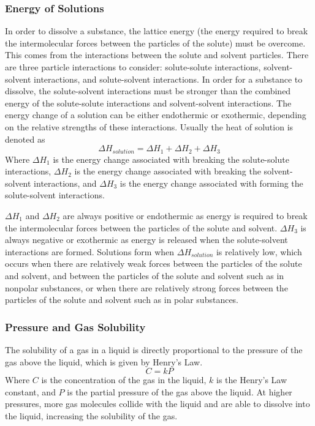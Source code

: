 \subsubsection{Energy of Solutions}
In order to dissolve a substance, the lattice energy (the energy required to break the intermolecular forces between the particles of the solute) must be overcome. This comes from the interactions between the solute and solvent particles. There are three particle interactions to consider: solute-solute interactions, solvent-solvent interactions, and solute-solvent interactions. In order for a substance to dissolve, the solute-solvent interactions must be stronger than the combined energy of the solute-solute interactions and solvent-solvent interactions. The energy change of a solution can be either endothermic or exothermic, depending on the relative strengths of these interactions. Usually the heat of solution is denoted as
\begin{equation}\label{eq:heat_of_solution}
    \Delta H_{solution} = \Delta H_1 + \Delta H_2 + \Delta H_3
\end{equation}
Where $\Delta H_1$ is the energy change associated with breaking the solute-solute interactions, $\Delta H_2$ is the energy change associated with breaking the solvent-solvent interactions, and $\Delta H_3$ is the energy change associated with forming the solute-solvent interactions.

$\Delta H_1$ and $\Delta H_2$ are always positive or endothermic as energy is required to break the intermolecular forces between the particles of the solute and solvent. $\Delta H_3$ is always negative or exothermic as energy is released when the solute-solvent interactions are formed. Solutions form when $\Delta H_{solution}$ is relatively low, which occurs when there are relatively weak forces between the particles of the solute and solvent, and between the particles of the solute and solvent such as in nonpolar substances, or when there are relatively strong forces between the particles of the solute and solvent such as in polar substances.
\subsubsection{Pressure and Gas Solubility}
The solubility of a gas in a liquid is directly proportional to the pressure of the gas above the liquid, which is given by Henry's Law. 
\begin{equation}\label{eq:henry}
    C = kP
\end{equation}
Where $C$ is the concentration of the gas in the liquid, $k$ is the Henry's Law constant, and $P$ is the partial pressure of the gas above the liquid. At higher pressures, more gas molecules collide with the liquid and are able to dissolve into the liquid, increasing the solubility of the gas. 
